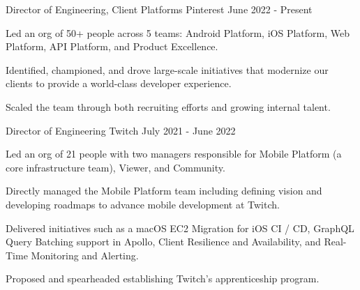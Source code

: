 

\begin{cventries}

  \cventry
    {Director of Engineering, Client Platforms} %
    {Pinterest} %
    {} %
    {June 2022 - Present} %
    {
	\begin{cvitems} %
	\item Led an org of 50+ people across 5 teams: Android Platform, iOS Platform, Web Platform, API Platform, and Product Excellence.	
	\item Identified, championed, and drove large-scale initiatives that modernize our clients to provide a world-class developer experience.
	\item Scaled the team through both recruiting efforts and growing internal talent.
	\end{cvitems}
    }

  \cventry
    {Director of Engineering} %
    {Twitch} %
    {} %
    {July 2021 - June 2022} %
    {
	\begin{cvitems} %
	\item Led an org of 21 people with two managers responsible for Mobile Platform (a core infrastructure team), Viewer, and Community.
	\item Directly managed the Mobile Platform team including defining vision and developing roadmaps to advance mobile development at Twitch.
	\item Delivered initiatives such as a macOS EC2 Migration for iOS CI / CD, GraphQL Query Batching support in Apollo, Client Resilience and Availability, and Real-Time Monitoring and Alerting.
	\item Proposed and spearheaded establishing Twitch’s apprenticeship program.
	\end{cvitems}
    }


\end{cventries}
